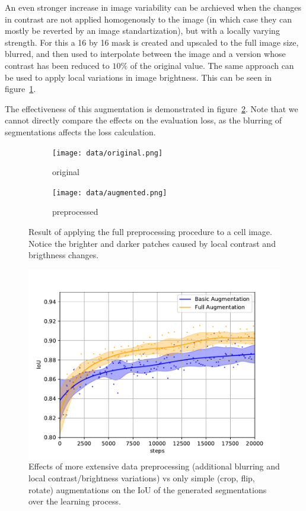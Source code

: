 \documentclass[aps,prl,twocolumn,groupedaddress,amsmath,amssymb]{revtex4-1}
\begin{document}
    An even stronger increase in image variability can be archieved when the changes in contrast are
    not applied homogenously to the image (in which case they can mostly be reverted by an  image
    standartization), but with a locally varying strength. For this a 16 by 16 mask is created and
    upscaled to the full image size, blurred, and then used to interpolate between the image and a
    version whose contrast has been reduced to $10\%$ of the original value. The same approach can
    be used to apply local variations in image brightness. This can be seen in
    figure~\ref{fig:augmentimage}.

    The effectiveness of this augmentation is demonstrated in figure~\ref{fig:augment}. Note that we
    cannot directly compare the effects on the  evaluation loss, as the blurring of segmentations
    affects the loss calculation.

    \begin{figure}[tbp]
        \begin{subfigure}[c]{0.45\linewidth}
            \texttt{[image: data/original.png]}
            \caption{original}
        \end{subfigure}
        \begin{subfigure}[c]{0.45\linewidth}
            \texttt{[image: data/augmented.png]}
            \caption{preprocessed}
        \end{subfigure}
        \caption{Result of applying the full preprocessing procedure to a cell image. 
        Notice the brighter and darker patches caused by local contrast and brigthness changes.}
        \label{fig:augmentimage}
    \end{figure}

    \begin{figure}[tbp]
        \begin{center}
        \includegraphics[width=\linewidth]{figures/augment.pdf}
        \end{center}
        \caption{Effects of more extensive data preprocessing (additional blurring and local 
        contrast/brightness variations) vs only simple (crop, flip, rotate) augmentations on the 
        IoU of the generated segmentations over the learning process.}
        \label{fig:augment}
    \end{figure}
\end{document}
